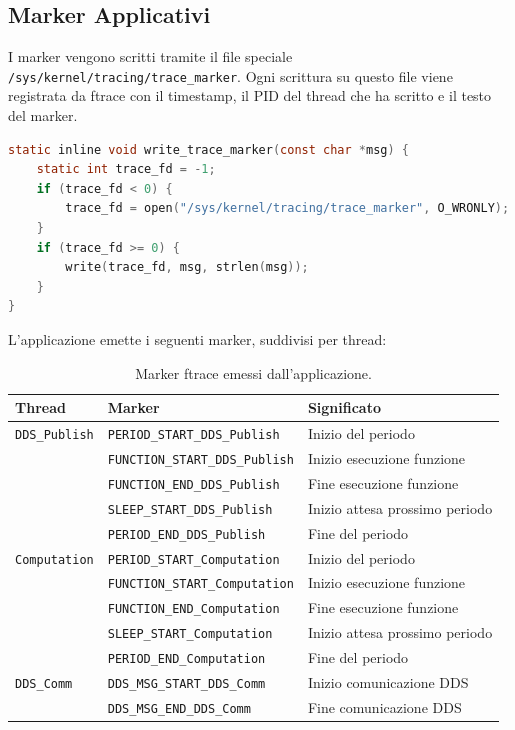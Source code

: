 \subsection{Marker Applicativi}
\label{subsec:marker}

I marker vengono scritti tramite il file speciale
\texttt{/sys/kernel/tracing/trace\_marker}. Ogni scrittura su questo file
viene registrata da ftrace con il timestamp, il PID del thread che ha
scritto e il testo del marker.

\begin{lstlisting}[language=C, caption={Funzione per scrivere marker ftrace.}, label={lst:write_marker}]
static inline void write_trace_marker(const char *msg) {
    static int trace_fd = -1;
    if (trace_fd < 0) {
        trace_fd = open("/sys/kernel/tracing/trace_marker", O_WRONLY);
    }
    if (trace_fd >= 0) {
        write(trace_fd, msg, strlen(msg));
    }
}
\end{lstlisting}

L'applicazione emette i seguenti marker, suddivisi per thread:

\begin{table}[htbp]
\centering
\caption{Marker ftrace emessi dall'applicazione.}
\label{tab:marker}
\begin{tabular}{llp{6cm}}
\toprule
\textbf{Thread} & \textbf{Marker} & \textbf{Significato} \\
\midrule
\texttt{DDS\_Publish} & \texttt{PERIOD\_START\_DDS\_Publish} & Inizio del periodo \\
                       & \texttt{FUNCTION\_START\_DDS\_Publish} & Inizio esecuzione funzione \\
                       & \texttt{FUNCTION\_END\_DDS\_Publish} & Fine esecuzione funzione \\
                       & \texttt{SLEEP\_START\_DDS\_Publish} & Inizio attesa prossimo periodo \\
                       & \texttt{PERIOD\_END\_DDS\_Publish} & Fine del periodo \\
\midrule
\texttt{Computation}   & \texttt{PERIOD\_START\_Computation} & Inizio del periodo \\
                       & \texttt{FUNCTION\_START\_Computation} & Inizio esecuzione funzione \\
                       & \texttt{FUNCTION\_END\_Computation} & Fine esecuzione funzione \\
                       & \texttt{SLEEP\_START\_Computation} & Inizio attesa prossimo periodo \\
                       & \texttt{PERIOD\_END\_Computation} & Fine del periodo \\
\midrule
\texttt{DDS\_Comm}     & \texttt{DDS\_MSG\_START\_DDS\_Comm} & Inizio comunicazione DDS \\
                       & \texttt{DDS\_MSG\_END\_DDS\_Comm} & Fine comunicazione DDS \\
\bottomrule
\end{tabular}
\end{table}

